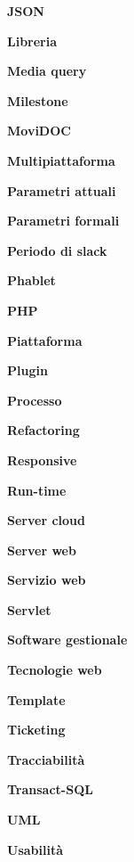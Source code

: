 \textbf{JSON}

\textbf{Libreria}

\textbf{Media query}

\textbf{Milestone}

\textbf{MoviDOC}

\textbf{Multipiattaforma}

\textbf{Parametri attuali}

\textbf{Parametri formali}

\textbf{Periodo di slack}

\textbf{Phablet}

\textbf{PHP}

\textbf{Piattaforma}

\textbf{Plugin}

\textbf{Processo}

\textbf{Refactoring}

\textbf{Responsive}

\textbf{Run-time}

\textbf{Server cloud}

\textbf{Server web}

\textbf{Servizio web}

\textbf{Servlet}

\textbf{Software gestionale}

\textbf{Tecnologie web}

\textbf{Template}

\textbf{Ticketing}

\textbf{Tracciabilità}

\textbf{Transact-SQL}

\textbf{UML}

\textbf{Usabilità}